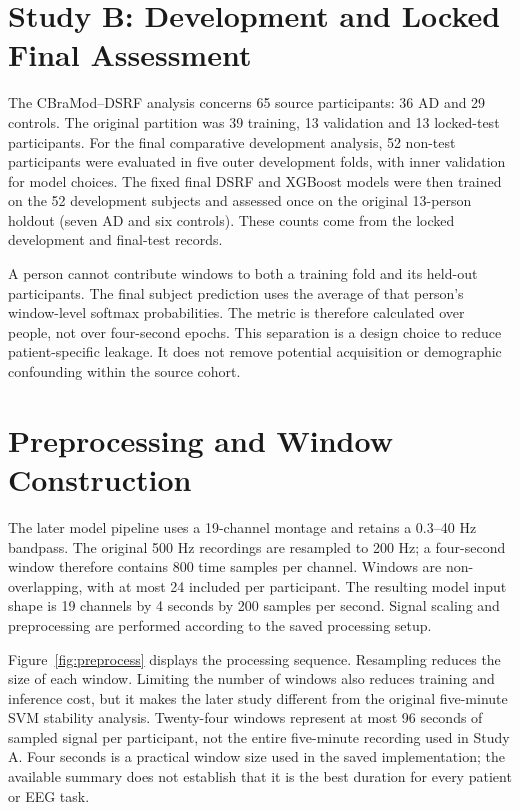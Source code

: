 \section{Study B: Development and Locked Final Assessment}
The CBraMod--DSRF analysis concerns 65 source participants: 36 AD and 29 controls. The original partition was 39 training, 13 validation and 13 locked-test participants. For the final comparative development analysis, 52 non-test participants were evaluated in five outer development folds, with inner validation for model choices. The fixed final DSRF and XGBoost models were then trained on the 52 development subjects and assessed once on the original 13-person holdout (seven AD and six controls). These counts come from the locked development and final-test records.

A person cannot contribute windows to both a training fold and its held-out participants. The final subject prediction uses the average of that person's window-level softmax probabilities. The metric is therefore calculated over people, not over four-second epochs. This separation is a design choice to reduce patient-specific leakage. It does not remove potential acquisition or demographic confounding within the source cohort.

\section{Preprocessing and Window Construction}
The later model pipeline uses a 19-channel montage and retains a 0.3--40 Hz bandpass. The original 500 Hz recordings are resampled to 200 Hz; a four-second window therefore contains 800 time samples per channel. Windows are non-overlapping, with at most 24 included per participant. The resulting model input shape is 19 channels by 4 seconds by 200 samples per second. Signal scaling and preprocessing are performed according to the saved processing setup.


Figure~\ref{fig:preprocess} displays the processing sequence. Resampling reduces the size of each window. Limiting the number of windows also reduces training and inference cost, but it makes the later study different from the original five-minute SVM stability analysis. Twenty-four windows represent at most 96 seconds of sampled signal per participant, not the entire five-minute recording used in Study A. Four seconds is a practical window size used in the saved implementation; the available summary does not establish that it is the best duration for every patient or EEG task.

